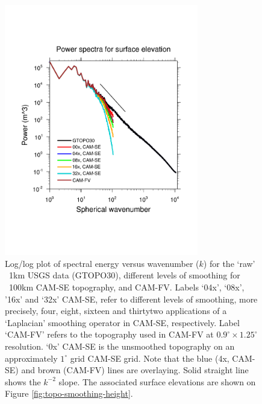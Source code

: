 \documentclass[gmd]{copernicus}
\begin{document}
\begin{figure}[tb]
\center\includegraphics[width=20pc,angle=0]{fig/tke-topo.pdf}
  \caption{Log/log plot of spectral energy versus wavenumber ($k$) for the `raw' ~1km USGS data (GTOPO30), different levels of smoothing for ~100km CAM-SE topography, and CAM-FV. Labels `04x', `08x', '16x' and `32x' CAM-SE, refer to different levels of smoothing, more precisely, four, eight, sixteen and thirtytwo applications of a `Laplacian' smoothing operator in CAM-SE, respectively. Label `CAM-FV' refers to the topography used in CAM-FV at $0.9^\circ \times 1.25^\circ$ resolution. `0x' CAM-SE is the unsmoothed topography on an approximately $1^\circ$ grid CAM-SE grid. Note that the blue (4x, CAM-SE) and brown (CAM-FV) lines are overlaying. Solid straight line shows the $k^{-2}$ slope. The associated surface elevations are shown on Figure \ref{fig:topo-smoothing-height}.}\label{fig:tke-topo}
\end{figure} 
%
\end{document}
